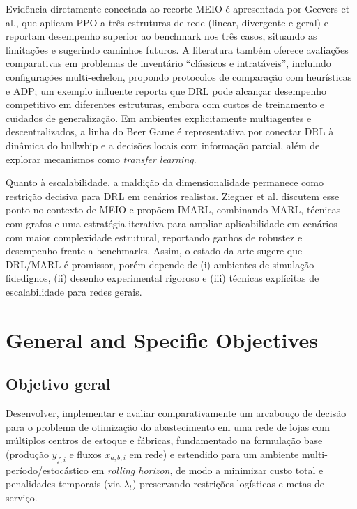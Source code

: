 Evidência diretamente conectada ao recorte MEIO é apresentada por Geevers et al., que aplicam PPO a três estruturas de rede (linear, divergente e geral) e reportam desempenho superior ao benchmark nos três casos, situando as limitações e sugerindo caminhos futuros. \cite{Geevers2024MEIODRL} A literatura também oferece avaliações comparativas em problemas de inventário ``clássicos e intratáveis'', incluindo configurações multi-echelon, propondo protocolos de comparação com heurísticas e ADP; um exemplo influente reporta que DRL pode alcançar desempenho competitivo em diferentes estruturas, embora com custos de treinamento e cuidados de generalização. \cite{Gijsbrechts2022DRLInventoryMSOM} Em ambientes explicitamente multiagentes e descentralizados, a linha do Beer Game é representativa por conectar DRL à dinâmica do bullwhip e a decisões locais com informação parcial, além de explorar mecanismos como \emph{transfer learning}. \cite{Oroojlooyjadid2022BeerGameDQN}

Quanto à escalabilidade, a maldição da dimensionalidade permanece como restrição decisiva para DRL em cenários realistas. Ziegner et al. discutem esse ponto no contexto de MEIO e propõem IMARL, combinando MARL, técnicas com grafos e uma estratégia iterativa para ampliar aplicabilidade em cenários com maior complexidade estrutural, reportando ganhos de robustez e desempenho frente a benchmarks. \cite{Ziegner2025IMARL} Assim, o estado da arte sugere que DRL/MARL é promissor, porém depende de (i) ambientes de simulação fidedignos, (ii) desenho experimental rigoroso e (iii) técnicas explícitas de escalabilidade para redes gerais.


\section{General and Specific Objectives}

\subsection*{Objetivo geral}

Desenvolver, implementar e avaliar comparativamente um arcabouço de decisão para o problema de otimização do abastecimento em uma rede de lojas com múltiplos centros de estoque e fábricas, fundamentado na formulação base (produção \(y_{f,i}\) e fluxos \(x_{a,b,i}\) em rede) e estendido para um ambiente multi-período/estocástico em \emph{rolling horizon}, de modo a minimizar custo total e penalidades temporais (via \(\lambda_t\)) preservando restrições logísticas e metas de serviço.

